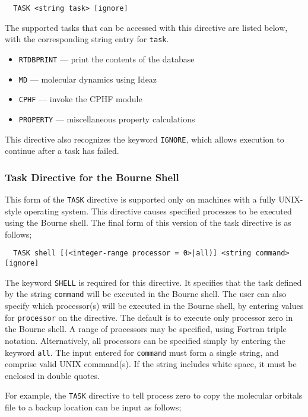 \begin{verbatim}
  TASK <string task> [ignore]
\end{verbatim}

The supported tasks that can be accessed with this directive are listed
below, with the corresponding string entry for \verb+task+.

\begin{itemize}
  \item \verb+RTDBPRINT+ --- print the contents of the database
  \item \verb+MD+ --- molecular dynamics using Ideaz
  \item \verb+CPHF+ --- invoke the CPHF module
  \item \verb+PROPERTY+ --- miscellaneous property calculations
\end{itemize}

This directive also recognizes the keyword \verb+IGNORE+, which allows
execution to continue after a task has failed.

\subsubsection{Task Directive for the Bourne Shell}

This form of the \verb+TASK+ directive is supported only on machines 
with a fully UNIX-style operating system.  This directive causes specified
processes to be executed using the Bourne shell.  The final form of this
version of the task directive is as follows;

\begin{verbatim}
  TASK shell [(<integer-range processor = 0>|all)] <string command> [ignore]
\end{verbatim}

The keyword \verb+SHELL+ is required for this directive.  It specifies
that the task defined by the string \verb+command+ will be executed in
the Bourne shell.  The user can also specify which processor(s) will be
executed in the Bourne shell, by entering values for \verb+processor+ on
the directive.  The default is to execute only processor zero in the 
Bourne shell.  A range of processors may be specified, using Fortran
triple notation.  Alternatively, all processors can be specified simply
by entering the keyword
\verb+all+.
The input entered for \verb+command+ must form a single string, and comprise
valid UNIX command(s).  If the string includes white space, it must be 
enclosed in double quotes.

For example, the \verb+TASK+ directive to tell process zero to copy the 
molecular orbitals file to a backup location can be input as follows;

